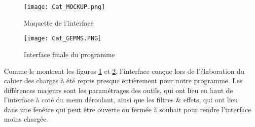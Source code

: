 \begin{figure}[!ht]
	\caption{Maquette de l'interface}
	\centering
	\texttt{[image: Cat\_MOCKUP.png]}
	\label{fig:cat_mockup}
\end{figure}

\begin{figure}[!ht]
	\caption{Interface finale du programme}
	\centering	
	\texttt{[image: Cat\_GEMMS.PNG]}
	\label{fig:cat_gemms}
\end{figure}

Comme le montrent les figures \ref{fig:cat_mockup} et \ref{fig:cat_gemms}, l'interface conçue lors de l'élaboration du cahier des charges à été repris presque entièrement pour notre programme. Les différences majeurs sont les paramétrages des outils, qui ont lieu en haut de l'interface à coté du menu déroulant, ainsi que les filtres \& effets, qui ont lieu dans une fenêtre qui peut être ouverte ou fermée à souhait pour rendre l'interface moins chargée. 
\newpage